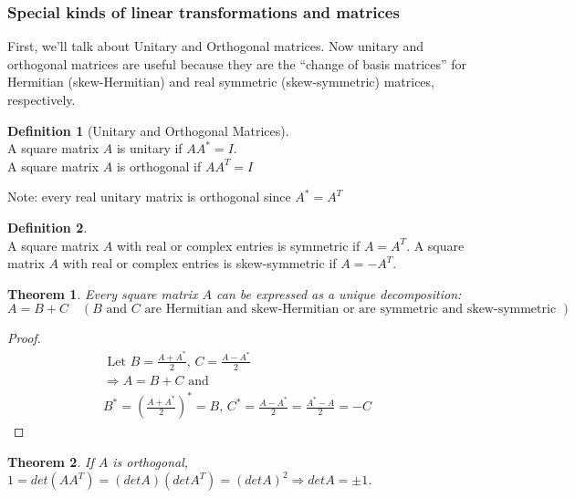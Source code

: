 \documentclass[twoside]{amsart}
\theoremstyle{plain}
\newtheorem{theorem}{Theorem}
\theoremstyle{definition}
\newtheorem{definition}{Definition}
\begin{document}
\subsubsection{ Special kinds of linear transformations and matrices }
First, we'll talk about Unitary and Orthogonal matrices.  Now unitary and orthogonal matrices are useful because they are the ``change of basis matrices'' for Hermitian (skew-Hermitian) and real symmetric (skew-symmetric) matrices, respectively.

\begin{definition}[Unitary and Orthogonal Matrices] \quad \\
A square matrix $A$ is unitary if $AA^* = I$.  \\
A square matrix $A$ is orthogonal if $AA^{T} = I $ 

\phantom{A sq} Note: every real unitary matrix is orthogonal since $A^* = A^T $
\end{definition}

\begin{definition} \quad \\
  A square matrix $A$ with real or complex entries is symmetric if $A = A^T$. 
  A square matrix $A$ with real or complex entries is skew-symmetric if $A = - A^T$. 
\end{definition}

\begin{theorem}
  Every square matrix $A$ can be expressed as a unique decomposition:
  \begin{equation*}
    A=B+C \quad (B \text{ and } C \text{ are Hermitian and skew-Hermitian or are symmetric and skew-symmetric })
  \end{equation*}
\end{theorem}
\begin{proof}
  \begin{gather*}
\text{ Let } B = \frac{ A + A^*}{2}, \, C = \frac{ A - A^*}{2} \\
\Longrightarrow A = B + C \text{ and } \\
B^* = \left( \frac{ A + A^*}{2} \right)^* = B, \,  C^* = \frac{ A - A^*}{2} = \frac{ A^* - A}{2} = -C
  \end{gather*}
\end{proof}

\begin{theorem}
If $A$ is orthogonal, $1 = det(AA^T) = (det A)(det A^T) = (det A)^2 \Longrightarrow det A = \pm 1$.  
\end{theorem}
\end{document}
